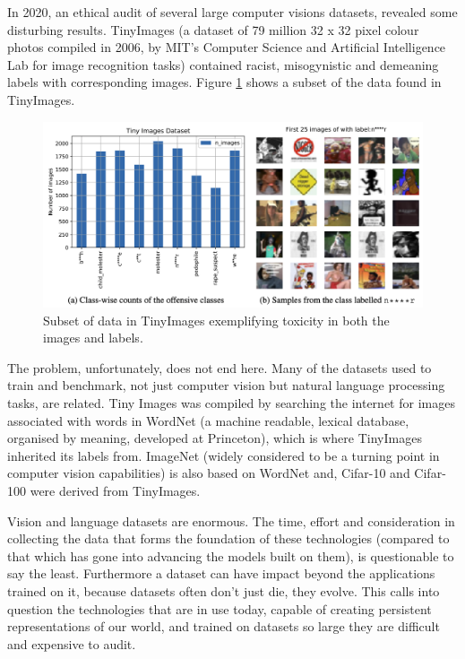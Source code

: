 In 2020, an ethical audit of several large computer visions datasets\cite{TinyImages}, revealed some disturbing results. TinyImages (a dataset of 79 million 32 x 32 pixel colour photos compiled in 2006, by  MIT's Computer Science and Artificial Intelligence Lab for image recognition tasks) contained racist, misogynistic and demeaning labels with corresponding images. Figure \ref{fig_TinyImages} shows a subset of the data found in TinyImages.
%
\begin{figure}[h!]
\centering
\includegraphics[width=\textwidth]{01_MotivationAndContext/figures/Fig_TinyImages.png}
\caption[Subset of data in TinyImages exemplifying toxicity in both the images and labels.]{Subset of data in TinyImages exemplifying toxicity in both the images and labels\cite{TinyImages}.}
\label{fig_TinyImages}
\end{figure}
%
The problem, unfortunately, does not end here. Many of the datasets used to train and benchmark, not just computer vision but natural language processing tasks, are related. Tiny Images was compiled by searching the internet for images associated with words in WordNet (a machine readable, lexical database, organised by meaning, developed at Princeton), which is where TinyImages inherited its labels from. ImageNet (widely considered to be a turning point in computer vision capabilities) is also based on WordNet and, Cifar-10 and Cifar-100 were derived from TinyImages.

Vision and language datasets are enormous. The time, effort and consideration in collecting the data that forms the foundation of these technologies (compared to that which has gone into advancing the models built on them), is questionable to say the least. Furthermore a dataset can have impact beyond the applications trained on it, because datasets often don't just die, they evolve. This calls into question the technologies that are in use today, capable of creating persistent representations of our world, and trained on datasets so large they are difficult and expensive to audit.

